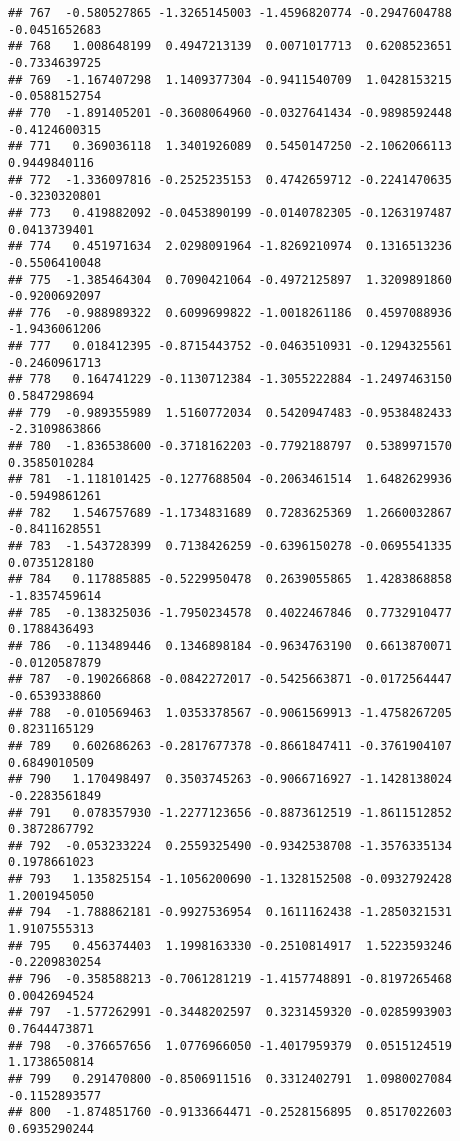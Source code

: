 \documentclass[
]{article}
\begin{document}
\begin{verbatim}
## 767  -0.580527865 -1.3265145003 -1.4596820774 -0.2947604788 -0.0451652683
## 768   1.008648199  0.4947213139  0.0071017713  0.6208523651 -0.7334639725
## 769  -1.167407298  1.1409377304 -0.9411540709  1.0428153215 -0.0588152754
## 770  -1.891405201 -0.3608064960 -0.0327641434 -0.9898592448 -0.4124600315
## 771   0.369036118  1.3401926089  0.5450147250 -2.1062066113  0.9449840116
## 772  -1.336097816 -0.2525235153  0.4742659712 -0.2241470635 -0.3230320801
## 773   0.419882092 -0.0453890199 -0.0140782305 -0.1263197487  0.0413739401
## 774   0.451971634  2.0298091964 -1.8269210974  0.1316513236 -0.5506410048
## 775  -1.385464304  0.7090421064 -0.4972125897  1.3209891860 -0.9200692097
## 776  -0.988989322  0.6099699822 -1.0018261186  0.4597088936 -1.9436061206
## 777   0.018412395 -0.8715443752 -0.0463510931 -0.1294325561 -0.2460961713
## 778   0.164741229 -0.1130712384 -1.3055222884 -1.2497463150  0.5847298694
## 779  -0.989355989  1.5160772034  0.5420947483 -0.9538482433 -2.3109863866
## 780  -1.836538600 -0.3718162203 -0.7792188797  0.5389971570  0.3585010284
## 781  -1.118101425 -0.1277688504 -0.2063461514  1.6482629936 -0.5949861261
## 782   1.546757689 -1.1734831689  0.7283625369  1.2660032867 -0.8411628551
## 783  -1.543728399  0.7138426259 -0.6396150278 -0.0695541335  0.0735128180
## 784   0.117885885 -0.5229950478  0.2639055865  1.4283868858 -1.8357459614
## 785  -0.138325036 -1.7950234578  0.4022467846  0.7732910477  0.1788436493
## 786  -0.113489446  0.1346898184 -0.9634763190  0.6613870071 -0.0120587879
## 787  -0.190266868 -0.0842272017 -0.5425663871 -0.0172564447 -0.6539338860
## 788  -0.010569463  1.0353378567 -0.9061569913 -1.4758267205  0.8231165129
## 789   0.602686263 -0.2817677378 -0.8661847411 -0.3761904107  0.6849010509
## 790   1.170498497  0.3503745263 -0.9066716927 -1.1428138024 -0.2283561849
## 791   0.078357930 -1.2277123656 -0.8873612519 -1.8611512852  0.3872867792
## 792  -0.053233224  0.2559325490 -0.9342538708 -1.3576335134  0.1978661023
## 793   1.135825154 -1.1056200690 -1.1328152508 -0.0932792428  1.2001945050
## 794  -1.788862181 -0.9927536954  0.1611162438 -1.2850321531  1.9107555313
## 795   0.456374403  1.1998163330 -0.2510814917  1.5223593246 -0.2209830254
## 796  -0.358588213 -0.7061281219 -1.4157748891 -0.8197265468  0.0042694524
## 797  -1.577262991 -0.3448202597  0.3231459320 -0.0285993903  0.7644473871
## 798  -0.376657656  1.0776966050 -1.4017959379  0.0515124519  1.1738650814
## 799   0.291470800 -0.8506911516  0.3312402791  1.0980027084 -0.1152893577
## 800  -1.874851760 -0.9133664471 -0.2528156895  0.8517022603  0.6935290244

\end{verbatim}
\end{document}
